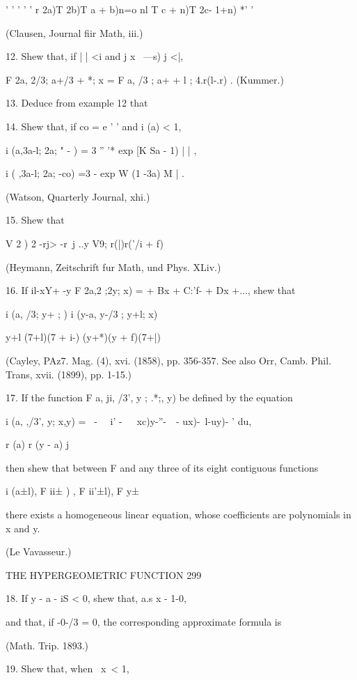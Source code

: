 '  ' ' '  ' r 2a)T 2b)T a + b)n=o nl T  c + n)T  2c- 1+n) *' ' 

(Clausen, Journal fiir Math, iii.) 

12. Shew that, if |   | <i and j x \ —s) j <|, 

F 2a, 2/3; a+/3 + *; x  = F a, /3 ; a+  + l ; 4.r(l-.r) . (Kummer.) 

13. Deduce from example 12 that 

14. Shew that, if co = e ' ' and i  (a) < 1, 

i (a,3a-l; 2a; " - ) = 3 '' '* exp [K Sa - 1)   |  | , 

i ( ,3a-l; 2a; -co) =3  -   exp   W (1 -3a)   M | . 

(Watson, Quarterly Journal, xhi.) 

15. Shew that 

V 2 ) 2 -rj> -r\ j ..y V9; r(|)r('/i + f) 

(Heymann, Zeitschrift fur Math, und Phys. XLiv.) 

16. If il-xY+ -y F 2a,2 ;2y; x) =  + Bx + C:'f- + Dx +..., 
shew that 

i (a, /3; y+ ;  ) i (y-a, y-/3 ; y+l; x) 

y+l (7+l)(7 + i-) (y+*)(y + f)(7+|) 

(Cayley, PAz7. Mag. (4), xvi. (1858), pp. 356-357. See also Orr, Camb. Phil. 
Trans, xvii. (1899), pp. 1-15.) 

17. If the function F  a, ji, /3', y ; .*;, y) be defined by the equation 

i (a, ,/3', y; x,y) = \ -  \ \  i' -\ \ ~xc)y-''-\ \ - ux)-\ l-uy)- ' du, 

r (a) r (y - a) j 

then shew that between F and any three of its eight contiguous functions 

i (a±l), F ii± ) , F ii'±l), F y±\ \  

there exists a homogeneous linear equation, whose coefficients are polynomials in x and y. 

(Le Vavasseur.) 



THE HYPERGEOMETRIC FUNCTION 299 

18. If y - a - iS < 0, shew that, a.s x - 1-0, 

and that, if  -0-/3 = 0, the corresponding approximate formula is 

(Math. Trip. 1893.) 

19. Shew that, when \ x\ <  1, 



